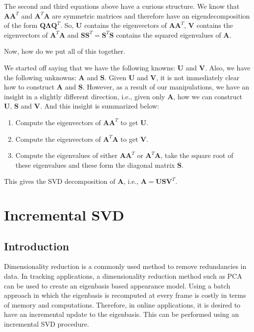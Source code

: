 The second and third equations above have a curious structure.  We know that $\mathbf{A}\mathbf{A}^T$ and $\mathbf{A}^T\mathbf{A}$ are symmetric matrices and therefore have an eigendecomposition of the form $\mathbf{Q}\mathbf{\Lambda}\mathbf{Q}^T$.  So, $\mathbf{U}$ contains the eigenvectors of $\mathbf{A}\mathbf{A}^T$, $\mathbf{V}$ contains the eigenvectors of $\mathbf{A}^T\mathbf{A}$ and $\mathbf{S} \mathbf{S}^T = \mathbf{S}^T \mathbf{S}$ contains the squared eigenvalues of  $\mathbf{A}$.

Now, how do we put all of this together.

We started off saying that we have the following knowns: $\mathbf{U}$ and $\mathbf{V}$.  Also, we have the following unknowns: $\mathbf{A}$ and $\mathbf{S}$.  Given $\mathbf{U}$ and $\mathbf{V}$, it is not immediately clear how to construct $\mathbf{A}$ and $\mathbf{S}$.  However, as a result of our manipulations, we have an insight in a slightly different direction, i.e., given only $\mathbf{A}$, how we can construct $\mathbf{U}$, $\mathbf{S}$ and $\mathbf{V}$.  And this insight is summarized below:

\begin{enumerate}
\item  Compute the eigenvectors of $\mathbf{A}\mathbf{A}^T$ to get $\mathbf{U}$.
\item  Compute the eigenvectors of $\mathbf{A}^T\mathbf{A}$ to get $\mathbf{V}$.
\item  Compute the eigenvalues of either $\mathbf{A}\mathbf{A}^T$ or $\mathbf{A}^T\mathbf{A}$, take the square root of these eigenvalues and these form the diagonal matrix $\mathbf{S}$.
\end{enumerate}

This gives the SVD decomposition of $\mathbf{A}$, i.e., $\mathbf{A} =\mathbf{U} \mathbf{S} \mathbf{V}^T$.

\section{Incremental SVD}

\subsection{Introduction}
Dimensionality reduction is a commonly used method to remove redundancies in data.  In tracking applications, a dimensionality reduction method such as PCA can be used to create an eigenbasis based appearance model.  Using a batch approach in which the eigenbasis is recomputed at every frame is costly in terms of memory and computations.  Therefore, in online applications, it is desired to have an incremental update to the eigenbasis.  This can be performed using an incremental SVD procedure.

